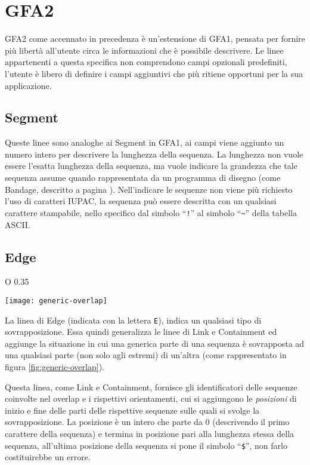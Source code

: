 \section{GFA2}
GFA2 come accennato in precedenza è un'estensione di GFA1, pensata
per fornire più libertà all'utente circa le informazioni che è possibile descrivere.
Le linee appartenenti a questa specifica non comprendono campi opzionali
predefiniti, l'utente è libero di definire i campi aggiuntivi che più ritiene opportuni
per la sua applicazione.


\subsection{Segment}
Queste linee sono analoghe ai Segment in GFA1, ai campi viene aggiunto
un numero intero per descrivere la lunghezza della sequenza.
La lunghezza non vuole essere l'esatta lunghezza della sequenza, ma
vuole indicare la grandezza che tale sequenza assume quando rappresentata
da un programma di disegno (come Bandage, descritto a pagina \pageref{sec:bandage}).
Nell'indicare le sequenze non viene più richiesto l'uso di caratteri IUPAC\cite{wiki:acid-notation},
la sequenza può essere descritta con un qualsiasi carattere stampabile,
nello specifico dal simbolo ``\texttt{!}'' al simbolo ``\texttt{\textasciitilde}''
della tabella ASCII.

\subsection{Edge}
\begin{wrapfigure} {O} {0.35\textwidth}
	\begin{centering}	
		\texttt{[image: generic-overlap]}
		\caption[Rappresentazione di una situazione generica di sovrapposizione fra sequenze]
		{Una rappresentazione grafica di una generica di sovrapposizione fra sequenze.}
		\label{fig:generic-overlap}
	\end{centering}
\end{wrapfigure}
La linea di Edge (indicata con la lettera \texttt{E}), indica un qualsiasi
tipo di sovrapposizione. Essa quindi generalizza le linee di Link e Containment
ed aggiunge la situazione in cui una generica parte di una sequenza
è sovrapposta ad una qualsiasi parte (non solo agli estremi) di
un'altra (come rappresentato in figura \ref{fig:generic-overlap}).

Questa linea, come Link e Containment, fornisce gli identificatori
delle sequenze coinvolte nel overlap e i rispettivi orientamenti, cui
si aggiungono le \emph{posizioni} di inizio e fine delle parti
delle rispettive sequenze sulle quali si svolge la sovrapposizione.
La posizione è un intero che parte da 0 (descrivendo il primo
carattere della sequenza) e termina in posizione pari alla
lunghezza stessa della sequenza, all'ultima posizione della sequenza
si pone il simbolo ``\texttt{\$}'', non farlo costituirebbe un errore.

